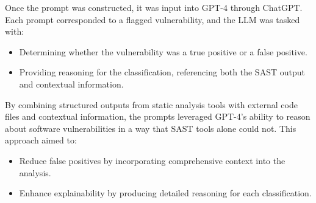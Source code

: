 Once the prompt was constructed, it was input into GPT-4 through ChatGPT. Each prompt corresponded to a flagged vulnerability, and the LLM was tasked with:
\begin{itemize}
    \item Determining whether the vulnerability was a true positive or a false positive.
    \item Providing reasoning for the classification, referencing both the SAST output and contextual information.
\end{itemize}

By combining structured outputs from static analysis tools with external code files and contextual information, the prompts leveraged GPT-4’s ability to reason about software vulnerabilities in a way that SAST tools alone could not. This approach aimed to:
\begin{itemize}
    \item Reduce false positives by incorporating comprehensive context into the analysis.
    \item Enhance explainability by producing detailed reasoning for each classification.
\end{itemize}
